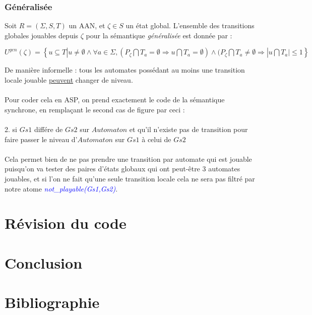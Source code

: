 \documentclass[12pt,a4paper]{article}
\begin{document}
\subsubsection{Généralisée}
Soit $R = (\Sigma,S,T)$ un AAN, et $\zeta\in S$ un état global. L'ensemble des transitions globales jouables depuis $\zeta$ pour la sémantique \emph{généralisée} est donnée par :
\begin{center}
	$U^{gen}(\zeta)=\left\{u\subseteq T|u \neq \emptyset \wedge \forall a\in\Sigma,(P_{\zeta}\bigcap T_a = \emptyset \Rightarrow u\bigcap 
	T_a=\emptyset)\wedge(P_{\zeta}\bigcap T_a\neq\emptyset\Rightarrow |u\bigcap T_a |\leq 1\right\}$
\end{center}
De manière informelle : tous les automates possédant au moins une transition locale jouable \underline{peuvent} changer de niveau.\\ \\
Pour coder cela en ASP, on prend exactement le code de la sémantique synchrone, en remplaçant le second cas de figure par ceci :\\ \\
2. si $Gs1$ différe de $Gs2$ sur $Automaton$ et qu'il n'existe pas de transition pour faire passer le niveau d'$Automaton$ sur $Gs1$ à celui de $Gs2$\\ \\
Cela permet bien de ne pas prendre une transition par automate qui est jouable puisqu'on va tester des paires d'états globaux qui ont peut-être 3 automates jouables, et si l'on ne fait qu'une seule transition locale cela ne sera pas 
filtré par notre atome \emph{\textcolor{blue}{not\_playable(Gs1,Gs2)}}.

	

\section{Révision du code}

\section{Conclusion}

\section{Bibliographie}
\end{document}
